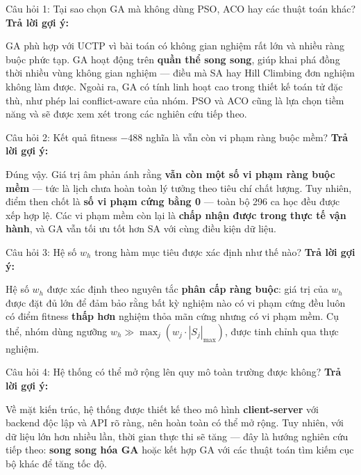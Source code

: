 \documentclass[12pt, a4paper]{article}
\begin{document}
\bigskip

\begin{questionbox}{Câu hỏi 1: Tại sao chọn GA mà không dùng PSO, ACO hay các thuật toán khác?}
\textbf{Trả lời gợi ý:}

GA phù hợp với UCTP vì bài toán có không gian nghiệm rất lớn và nhiều ràng buộc phức tạp. GA hoạt động trên \textbf{quần thể song song}, giúp khai phá đồng thời nhiều vùng không gian nghiệm --- điều mà SA hay Hill Climbing đơn nghiệm không làm được. Ngoài ra, GA có tính linh hoạt cao trong thiết kế toán tử đặc thù, như phép lai conflict-aware của nhóm. PSO và ACO cũng là lựa chọn tiềm năng và sẽ được xem xét trong các nghiên cứu tiếp theo.
\end{questionbox}

\bigskip

\begin{questionbox}{Câu hỏi 2: Kết quả fitness $-488$ nghĩa là vẫn còn vi phạm ràng buộc mềm?}
\textbf{Trả lời gợi ý:}

Đúng vậy. Giá trị âm phản ánh rằng \textbf{vẫn còn một số vi phạm ràng buộc mềm} --- tức là lịch chưa hoàn toàn lý tưởng theo tiêu chí chất lượng. Tuy nhiên, điểm then chốt là \textbf{số vi phạm cứng bằng 0} --- toàn bộ 296 ca học đều được xếp hợp lệ. Các vi phạm mềm còn lại là \textbf{chấp nhận được trong thực tế vận hành}, và GA vẫn tối ưu tốt hơn SA với cùng điều kiện dữ liệu.
\end{questionbox}

\bigskip

\begin{questionbox}{Câu hỏi 3: Hệ số $w_h$ trong hàm mục tiêu được xác định như thế nào?}
\textbf{Trả lời gợi ý:}

Hệ số $w_h$ được xác định theo nguyên tắc \textbf{phân cấp ràng buộc}: giá trị của $w_h$ được đặt đủ lớn để đảm bảo rằng bất kỳ nghiệm nào có vi phạm cứng đều luôn có điểm fitness \textbf{thấp hơn} nghiệm thỏa mãn cứng nhưng có vi phạm mềm. Cụ thể, nhóm dùng ngưỡng $w_h \gg \max_j(w_j \cdot |S_j|_{\max})$, được tinh chỉnh qua thực nghiệm.
\end{questionbox}

\bigskip

\begin{questionbox}{Câu hỏi 4: Hệ thống có thể mở rộng lên quy mô toàn trường được không?}
\textbf{Trả lời gợi ý:}

Về mặt kiến trúc, hệ thống được thiết kế theo mô hình \textbf{client-server} với backend độc lập và API rõ ràng, nên hoàn toàn có thể mở rộng. Tuy nhiên, với dữ liệu lớn hơn nhiều lần, thời gian thực thi sẽ tăng --- đây là hướng nghiên cứu tiếp theo: \textbf{song song hóa GA} hoặc kết hợp GA với các thuật toán tìm kiếm cục bộ khác để tăng tốc độ.
\end{questionbox}
\end{document}
